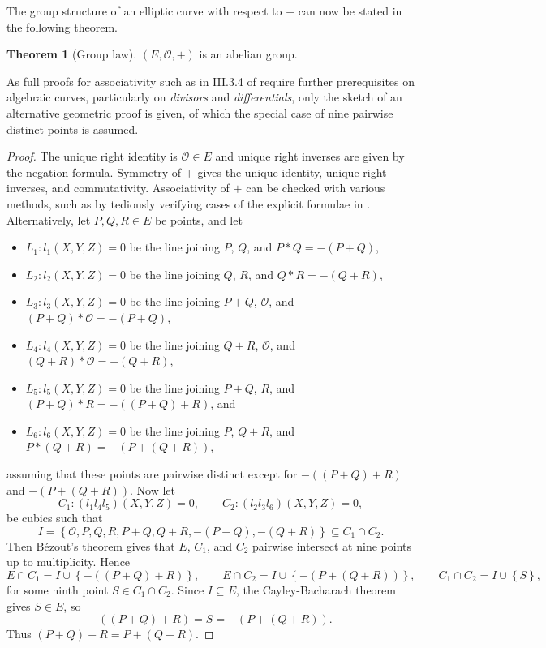 \documentclass{article}
\newcommand{\rb}[1]{\left( #1 \right)}
\newcommand{\cb}[1]{\left\{ #1 \right\}}
\theoremstyle{definition}\newtheorem*{definition}{Definition}
\theoremstyle{definition}\newtheorem*{example}{Example}
\theoremstyle{definition}\newtheorem*{remark}{Remark}
\newtheorem{theorem}[proposition]{Theorem}
\begin{document}
\pagebreak

The group structure of an elliptic curve with respect to $ + $ can now be stated in the following theorem.

\begin{theorem}[Group law]
$ \rb{E, \mathcal{O}, +} $ is an abelian group.
\end{theorem}

As full proofs for associativity such as in III.3.4 of \cite{gtm} require further prerequisites on algebraic curves, particularly on \emph{divisors} and \emph{differentials}, only the sketch of an alternative geometric proof is given, of which the special case of nine pairwise distinct points is assumed.

\begin{proof}
The unique right identity is $ \mathcal{O} \in E $ and unique right inverses are given by the negation formula. Symmetry of $ + $ gives the unique identity, unique right inverses, and commutativity. Associativity of $ + $ can be checked with various methods, such as by tediously verifying cases of the explicit formulae in \cite{grouplaw}. Alternatively, let $ P, Q, R \in E $ be points, and let
\begin{itemize}
\item $ L_1 : l_1\rb{X, Y, Z} = 0 $ be the line joining $ P $, $ Q $, and $ P * Q = -\rb{P + Q} $,
\item $ L_2 : l_2\rb{X, Y, Z} = 0 $ be the line joining $ Q $, $ R $, and $ Q * R = -\rb{Q + R} $,
\item $ L_3 : l_3\rb{X, Y, Z} = 0 $ be the line joining $ P + Q $, $ \mathcal{O} $, and $ \rb{P + Q} * \mathcal{O} = -\rb{P + Q} $,
\item $ L_4 : l_4\rb{X, Y, Z} = 0 $ be the line joining $ Q + R $, $ \mathcal{O} $, and $ \rb{Q + R} * \mathcal{O} = -\rb{Q + R} $,
\item $ L_5 : l_5\rb{X, Y, Z} = 0 $ be the line joining $ P + Q $, $ R $, and $ \rb{P + Q} * R = -\rb{\rb{P + Q} + R} $, and
\item $ L_6 : l_6\rb{X, Y, Z} = 0 $ be the line joining $ P $, $ Q + R $, and $ P * \rb{Q + R} = -\rb{P + \rb{Q + R}} $,
\end{itemize}
assuming that these points are pairwise distinct except for $ -\rb{\rb{P + Q} + R} $ and $ -\rb{P + \rb{Q + R}} $. Now let
$$ C_1 : \rb{l_1l_4l_5}\rb{X, Y, Z} = 0, \qquad C_2 : \rb{l_2l_3l_6}\rb{X, Y, Z} = 0, $$
be cubics such that
$$ I = \cb{\mathcal{O}, P, Q, R, P + Q, Q + R, -\rb{P + Q}, -\rb{Q + R}} \subseteq C_1 \cap C_2. $$
Then Bézout's theorem gives that $ E $, $ C_1 $, and $ C_2 $ pairwise intersect at nine points up to multiplicity. Hence
$$ E \cap C_1 = I \cup \cb{-\rb{\rb{P + Q} + R}}, \qquad E \cap C_2 = I \cup \cb{-\rb{P + \rb{Q + R}}}, \qquad C_1 \cap C_2 = I \cup \cb{S}, $$
for some ninth point $ S \in C_1 \cap C_2 $. Since $ I \subseteq E $, the Cayley-Bacharach theorem gives $ S \in E $, so
$$ -\rb{\rb{P + Q} + R} = S = -\rb{P + \rb{Q + R}}. $$
Thus $ \rb{P + Q} + R = P + \rb{Q + R} $.
\end{proof}
\end{document}
